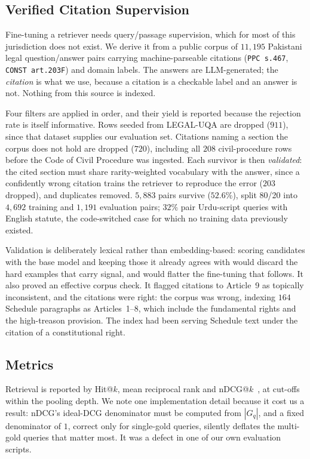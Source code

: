 \documentclass[conference]{IEEEtran}
\begin{document}
\subsection{Verified Citation Supervision}
\label{sec:citationdata}
Fine-tuning a retriever needs query/passage supervision, which for most of this
jurisdiction does not exist. We derive it from a public corpus of $11{,}195$
Pakistani legal question/answer pairs carrying machine-parseable citations
(\texttt{PPC s.467}, \texttt{CONST art.203F}) and domain labels. The answers are
LLM-generated; the \emph{citation} is what we use, because a citation is a
checkable label and an answer is not. Nothing from this source is indexed.

Four filters are applied in order, and their yield is reported because the
rejection rate is itself informative. Rows seeded from LEGAL-UQA are dropped
($911$), since that dataset supplies our evaluation set. Citations naming a
section the corpus does not hold are dropped ($720$), including all $208$
civil-procedure rows before the Code of Civil Procedure was ingested. Each
survivor is then \emph{validated}: the cited section must share
rarity-weighted vocabulary with the answer, since a confidently wrong citation
trains the retriever to reproduce the error ($203$ dropped), and duplicates
removed. $5{,}883$ pairs survive ($52.6\%$), split 80/20 into $4{,}692$ training
and $1{,}191$ evaluation pairs; $32\%$ pair Urdu-script queries with English
statute, the code-switched case for which no training data previously existed.

Validation is deliberately lexical rather than embedding-based: scoring
candidates with the base model and keeping those it already agrees with would
discard the hard examples that carry signal, and would flatter the fine-tuning
that follows. It also proved an effective corpus check. It flagged citations to
Article~9 as topically inconsistent, and the citations were right: the corpus
was wrong, indexing $164$ Schedule paragraphs as Articles~1--8, which include
the fundamental rights and the high-treason provision. The index had been
serving Schedule text under the citation of a constitutional right.

\subsection{Metrics}
Retrieval is reported by Hit@$k$, mean reciprocal rank and
nDCG@$k$~\cite{jarvelin2002ndcg}, at cut-offs within the pooling depth. We note
one implementation detail because it cost us a result: nDCG's ideal-DCG
denominator must be computed from $|G_q|$, and a fixed denominator of $1$, correct only for single-gold queries, silently deflates the multi-gold
queries that matter most. It was a defect in one of our own evaluation
scripts.
\end{document}

